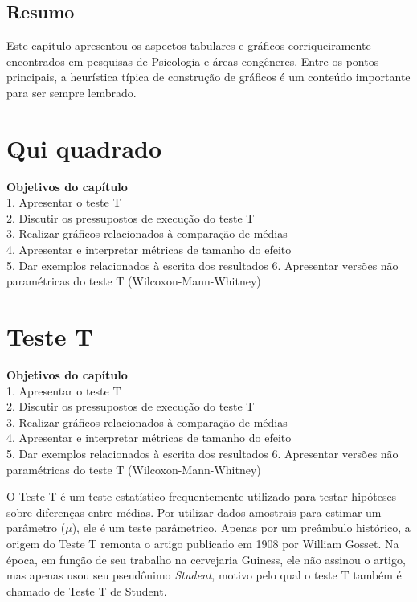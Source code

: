 \documentclass[
]{book}
\begin{document}
\hypertarget{resumo}{%
\section{Resumo}\label{resumo}}

Este capítulo apresentou os aspectos tabulares e gráficos corriqueiramente encontrados em pesquisas de Psicologia e áreas congêneres. Entre os pontos principais, a heurística típica de construção de gráficos é um conteúdo importante para ser sempre lembrado.

\hypertarget{qui-quadrado}{%
\chapter{Qui quadrado}\label{qui-quadrado}}

\begin{objectives}
\textbf{Objetivos do capítulo}\\
1. Apresentar o teste T\\
2. Discutir os pressupostos de execução do teste T\\
3. Realizar gráficos relacionados à comparação de médias\\
4. Apresentar e interpretar métricas de tamanho do efeito\\
5. Dar exemplos relacionados à escrita dos resultados 6. Apresentar
versões não paramétricas do teste T (Wilcoxon-Mann-Whitney)
\end{objectives}

\hypertarget{teste-t}{%
\chapter{Teste T}\label{teste-t}}

\begin{objectives}
\textbf{Objetivos do capítulo}\\
1. Apresentar o teste T\\
2. Discutir os pressupostos de execução do teste T\\
3. Realizar gráficos relacionados à comparação de médias\\
4. Apresentar e interpretar métricas de tamanho do efeito\\
5. Dar exemplos relacionados à escrita dos resultados 6. Apresentar
versões não paramétricas do teste T (Wilcoxon-Mann-Whitney)
\end{objectives}

O Teste T é um teste estatístico frequentemente utilizado para testar hipóteses sobre diferenças entre médias. Por utilizar dados amostrais para estimar um parâmetro (\(\mu\)), ele é um teste parâmetrico. Apenas por um preâmbulo histórico, a origem do Teste T remonta o artigo publicado em 1908 por William Gosset. Na época, em função de seu trabalho na cervejaria Guiness, ele não assinou o artigo, mas apenas usou seu pseudônimo \emph{Student}, motivo pelo qual o teste T também é chamado de Teste T de Student.
\end{document}
